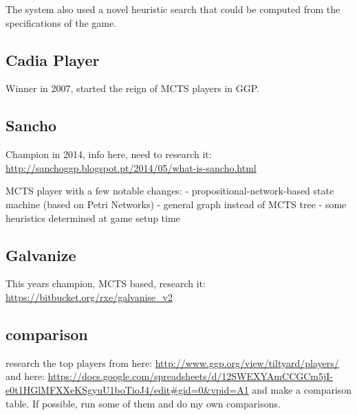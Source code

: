 The system also used a novel heuristic search that could be computed from the specifications of the game.

\subsection{Cadia Player}
Winner in 2007, started the reign of MCTS players in GGP.

\subsection{Sancho}
Champion in 2014, info here, need to research it: \url{http://sanchoggp.blogspot.pt/2014/05/what-is-sancho.html}

MCTS player with a few notable changes:
- propositional-network-based state machine (based on Petri Networks)
- general graph instead of MCTS tree
- some heuristics determined at game setup time

\subsection{Galvanize}
This years champion, MCTS based, research it:
\url{https://bitbucket.org/rxe/galvanise_v2}

\subsection{comparison}
research the top players from here:
\url{http://www.ggp.org/view/tiltyard/players/}
and here:
\url{https://docs.google.com/spreadsheets/d/12SWEXYAmCCGCm5jI-e0t1HGlMFXXeKSgyuU1boTioJ4/edit#gid=0&vpid=A1}
and make a comparison table.
If possible, run some of them and do my own comparisons.




